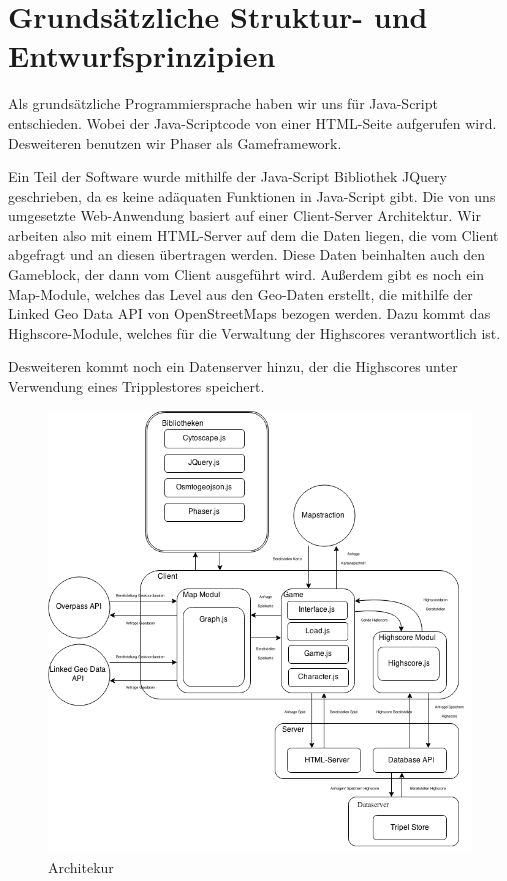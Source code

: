 \documentclass[11pt,a4paper]{article}
\begin{document}
\section{Grundsätzliche Struktur- und Entwurfsprinzipien}
Als grundsätzliche Programmiersprache haben wir uns für Java-Script entschieden. Wobei der Java-Scriptcode von einer HTML-Seite aufgerufen wird. Desweiteren benutzen wir Phaser als Gameframework.

Ein Teil der Software wurde mithilfe der Java-Script Bibliothek JQuery geschrieben, da es keine adäquaten Funktionen in Java-Script gibt. 
Die von uns umgesetzte Web-Anwendung basiert auf einer Client-Server Architektur. Wir arbeiten also mit einem HTML-Server auf dem die Daten liegen, die vom Client abgefragt und an diesen übertragen werden. Diese Daten beinhalten auch den Gameblock, der dann vom Client ausgeführt wird. Außerdem gibt es noch ein Map-Module, welches das Level aus den Geo-Daten erstellt, die mithilfe der Linked Geo Data API von OpenStreetMaps bezogen werden. Dazu kommt das Highscore-Module, welches für die Verwaltung der Highscores verantwortlich ist.


Desweiteren kommt noch ein Datenserver hinzu, der die Highscores unter Verwendung eines Tripplestores speichert.\\
\begin{figure}[htb]
  \centering
  \includegraphics[scale=0.6]{dia_2.png}
\caption{Architekur}
  \label{arch}
\end{figure} 
\end{document}
